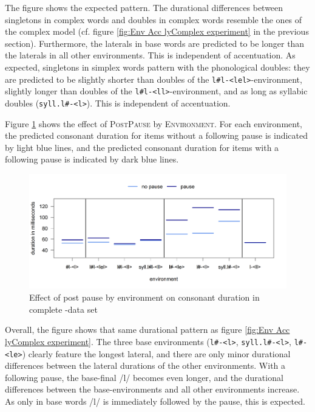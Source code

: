  The figure shows the expected pattern. The durational differences between singletons in complex words and doubles in complex words resemble the ones of the complex model (cf. figure \ref{fig:Env Acc lyComplex experiment} in the previous section). 
 Furthermore, the laterals in base words are predicted to be longer than the laterals in all other environments. This is independent of accentuation. 
 As expected, singletons in simplex words pattern with the phonological doubles: they are predicted to be slightly shorter than doubles of the \texttt{l\#l-<lel>}-environment, slightly longer than doubles of the \texttt{l\#l-<ll>}-environment, and as long as syllabic doubles (\texttt{syll.l\#-<l>}). This is independent of accentuation.
 
 
 
 Figure \ref{fig:Env pause lyComplete experiment} shows the effect of \textsc{PostPause} by \textsc{Environment}. For each environment, the predicted consonant duration for items without a following pause is indicated by light blue lines, and the predicted consonant duration for  items with a following pause is indicated by dark blue lines.

 \begin{figure} [h!]
 	\centering

 	\includegraphics [scale=0.48] {images/Experiment/LyModelCompleteInterEnvPauseLines}

 	\caption{Effect of  post pause by environment on consonant duration in complete -data set}
 	\label{fig:Env pause lyComplete experiment}

 \end{figure}
 

 Overall, the figure shows that same durational pattern as figure \ref{fig:Env Acc lyComplex experiment}. The three base environments (\texttt{l\#-<l>}, \texttt{syll.l\#-<l>}, \texttt{l\#-<le>}) clearly feature the longest lateral, and there are only minor durational differences between the lateral durations of the other environments. 
 With a following pause, the base-final /l/ becomes even longer, and the durational differences between the base-environments and all other environments increase. As only in base words /l/ is immediately followed by the pause, this is expected. 



